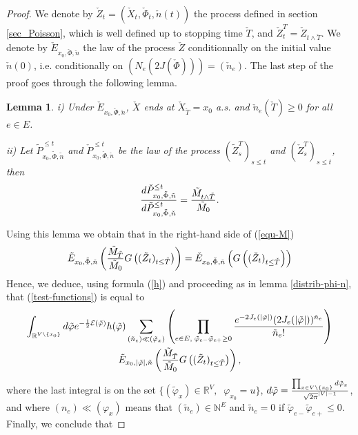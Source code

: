 \documentclass[11pt,a4paper]{amsart}
\numberwithin{equation}{section}
\newtheorem{lemma}[proposition]{Lemma}
\def\R{{\mathbb R}}
\def\N{{\mathbb N}}
\def\demi{{1\over 2}}
\def\eee{{\mathcal E}}
\begin{document}
\begin{proof}
We denote by $\check Z_t=(\check X_t, \check \Phi_t, \check n(t))$ the process defined in section \ref{sec_Poisson}, which is well defined up to
stopping time $\check T$, and $\check Z^T_t=\check Z_{t\wedge \check T}$. We denote by $\check E_{x_0, \check \Phi, \check n}$
the law of the process $\check Z$ conditionnally on the initial value $\check n(0)$, i.e. conditionally on $(N_e(2J(\check\Phi)))=(\check n_e)$.
The last step of the proof goes through the following lemma.
\begin{lemma}\label{RN}
i) Under $\check E_{x_0,\check\Phi,\check n}$, $\check X$ ends at $\check X_{\check T}=x_0$ a.s. and 
$\check n_e(\check T)\ge 0$ for all $e\in E$.

ii) Let $\tilde P^{\le t}_{x_0,\tilde\Phi,\tilde n}$ and $\check P^{\le t}_{x_0,\check\Phi,\check n}$ be the law
of the process $(\tilde Z^T_s)_{s\le t}$ and $(\check Z^T_s)_{s\le t}$, then
$$
{d\check P^{\le t}_{x_0,\tilde \Phi,\tilde n}\over d\tilde P^{\le t}_{x_0,\tilde \Phi,\check n}}={\tilde M_{t\wedge \tilde T}\over \tilde M_0}.
$$
\end{lemma}
Using this lemma we obtain that in the right-hand side of (\ref{equ-M})
$$
\tilde E_{x_0, \tilde \Phi , \tilde n}\left(
{\tilde M_{\tilde T}\over \tilde M_0} 
 G\left((\tilde Z_{t})_{t\le\tilde T}\right)\right)=
 \check E_{x_0, \tilde \Phi , \tilde n}
 \left(  
 G\left((\check Z_{t})_{t\le\check T}\right)\right)
$$
Hence, we deduce, using formula (\ref{h}) and proceeding as in lemma \ref{distrib-phi-n}, that (\ref{test-functions}) is equal to
\begin{multline*}
\label{final}
\int_{\R^{V\setminus\{x_0\} }} d\tilde\varphi
e^{-\demi \eee(\tilde\varphi)}  h(\tilde \varphi) 
\sum_{(\tilde n_e)\ll (\tilde \varphi_x)} \left(\prod_{e\in E, \; \tilde\varphi_{e-}\tilde\varphi_{e+}\ge 0} 
{e^{-2J_e(\vert \tilde \varphi\vert)}(2J_e(\vert \tilde \varphi\vert ))^{\tilde n_e}\over \tilde n_e !}\right) 
\\\tilde E_{x_0, \vert \tilde \varphi\vert , \tilde n}\left({\tilde M_{\tilde T}\over \tilde M_0} 
 G\left((\tilde Z_{t})_{t\le\tilde T}\right)\right),
\end{multline*}
where the last integral is on the set $\{(\tilde\varphi_x)\in \R^V, \;\; \varphi_{x_0}=u\}$,
$d\tilde\varphi={\prod_{x\in V\setminus\{x_0\}} d\tilde\varphi_x\over \sqrt{2\pi}^{\vert V\vert -1}}$, and where $(n_e)\ll (\varphi_x)$ means that
$(\tilde n_e)\in \N^E$ and $\tilde n_e=0$ if $\tilde\varphi_{e-}\tilde\varphi_{e+}\le 0$.
Finally, we conclude that

\end{proof}
\end{document}
